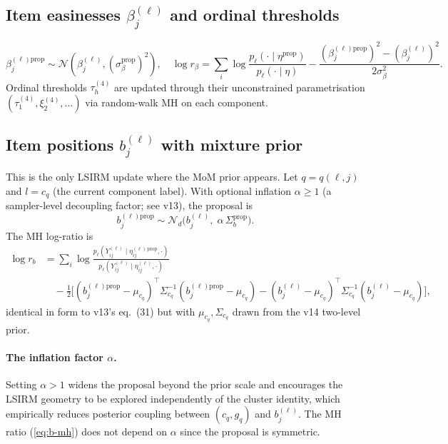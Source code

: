\documentclass[11pt]{article}
\newcommand{\trans}{^{\top}}
\begin{document}
\subsection{Item easinesses $\beta_j^{(\ell)}$ and ordinal thresholds}
\begin{equation}
\beta_j^{(\ell)\mathrm{prop}}\sim\mathcal{N}(\beta_j^{(\ell)},(\sigma_\beta^{\mathrm{prop}})^2),
\quad
\log r_\beta = \sum_i\log\frac{p_\ell(\cdot\mid\eta^{\mathrm{prop}})}{p_\ell(\cdot\mid\eta)}
   - \frac{(\beta_j^{(\ell)\mathrm{prop}})^2 - (\beta_j^{(\ell)})^2}{2\sigma_\beta^2}.
\label{eq:beta-mh}
\end{equation}
Ordinal thresholds $\tau_h^{(4)}$ are updated through their unconstrained
parametrisation $(\tau_1^{(4)},\xi_2^{(4)},\ldots)$ via random-walk MH on
each component.

\subsection{Item positions $b_j^{(\ell)}$ with mixture prior}

This is the only LSIRM update where the MoM prior appears. Let
$q=q(\ell,j)$ and $l=c_q$ (the current component label). With optional
inflation $\alpha\ge 1$ (a sampler-level decoupling factor; see v13),
the proposal is
\begin{equation}
b_j^{(\ell)\mathrm{prop}} \sim \mathcal{N}_d\!\bigl(b_j^{(\ell)},\;\alpha\,\Sigma_b^{\mathrm{prop}}\bigr).
\label{eq:b-prop}
\end{equation}
The MH log-ratio is
\begin{equation}
\begin{aligned}
\log r_b
&= \sum_i\log\frac{p_\ell(Y_{ij}^{(\ell)}\mid\eta_{ij}^{(\ell)\,\mathrm{prop}},\cdot)}
                  {p_\ell(Y_{ij}^{(\ell)}\mid\eta_{ij}^{(\ell)},\cdot)}\\
&\quad
   -\tfrac12\bigl[
   (b_j^{(\ell)\mathrm{prop}}-\mu_{c_q})\trans\Sigma_{c_q}^{-1}(b_j^{(\ell)\mathrm{prop}}-\mu_{c_q})
  -(b_j^{(\ell)}-\mu_{c_q})\trans\Sigma_{c_q}^{-1}(b_j^{(\ell)}-\mu_{c_q})\bigr],
\end{aligned}
\label{eq:b-mh}
\end{equation}
identical in form to v13's eq.~(31) but with $\mu_{c_q},\Sigma_{c_q}$
drawn from the v14 two-level prior.

\paragraph{The inflation factor $\alpha$.} Setting $\alpha>1$ widens the
proposal beyond the prior scale and encourages the LSIRM geometry to be
explored independently of the cluster identity, which empirically reduces
posterior coupling between $(c_q,g_q)$ and $b_j^{(\ell)}$. The MH ratio
(\ref{eq:b-mh}) does not depend on $\alpha$ since the proposal is
symmetric.
\end{document}
